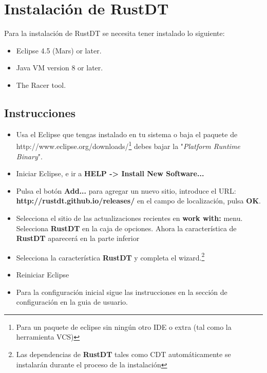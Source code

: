 \documentclass[12pt, twoside]{report}
\begin{document}
\section{Instalación de RustDT}

Para la instalación de RustDT se necesita tener instalado lo siguiente:

\begin{itemize}

 \item Eclipse 4.5 (Mars) or later.
 \item Java VM version 8 or later.
 \item The Racer tool.

\end{itemize}

\subsection{Instrucciones}
\begin{itemize}
\item Usa el Eclipse que tengas instalado en tu sistema o baja el paquete de http://www.eclipse.org/downloads/\footnote{Para un paquete de eclipse sin ningún otro IDE o extra (tal como la herramienta VCS)} debes bajar la "\textit{Platform Runtime Binary}".

\item Iniciar Eclipse, e ir a \textbf{HELP -> Install New Software...}

\item Pulsa el botón \textbf{Add...} para agregar un nuevo sitio, introduce el URL: \textbf{http://rustdt.github.io/releases/} en el campo de localización, pulsa \textbf{OK}.

\item Selecciona el sitio de las actualizaciones recientes en \textbf{work with:} menu. Selecciona \textbf{RustDT} en la caja de opciones. Ahora la característica de \textbf{RustDT} aparecerá en la parte inferior

\item Selecciona la característica \textbf{RustDT} y completa el wizard.\footnote{Las dependencias de \textbf{RustDT} tales como CDT automáticamente  se instalarán durante el proceso de la instalación }

\item Reiniciar Eclipse  

\item Para la configuración inicial sigue las instrucciones en la sección de configuración en la guia de usuario. 

\end{itemize}
\end{document}
